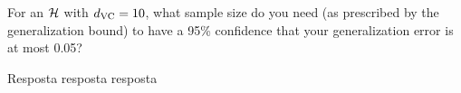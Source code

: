 \begin{enunciado}{12}
    For an $\mathcal{H}$ with $d_{\text{VC}} = 10$, what sample size
    do you need (as prescribed by the generalization bound) to have a 95\% confidence that your generalization error is at most 0.05?
\end{enunciado}

Resposta resposta resposta